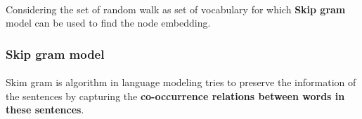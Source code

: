 \paragraph{} Considering the set of random walk as set of vocabulary for which \textbf{Skip gram} model can be used to find the node embedding.
\subsubsection{Skip gram model}
\paragraph{} Skim gram is algorithm in language modeling tries to preserve the information of the sentences by capturing the \textbf{co-occurrence relations between words in these sentences}.


    